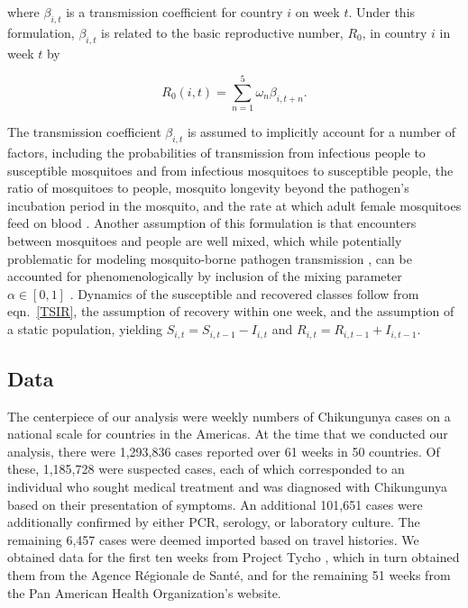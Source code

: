 \documentclass[11pt]{article}
\begin{document}
\noindent where $\beta_{i,t}$ is a transmission coefficient for country $i$ on week $t$. Under this formulation, $\beta_{i,t}$ is related to the basic reproductive number, $R_0$, in country $i$ in week $t$ by

\begin{equation}
R_0(i,t) = \sum_{n=1}^5 \omega_n \beta_{i,t+n} .
\end{equation}

\noindent The transmission coefficient $\beta_{i,t}$ is assumed to implicitly account for a number of factors, including the probabilities of transmission from infectious people to susceptible mosquitoes and from infectious mosquitoes to susceptible people, the ratio of mosquitoes to people, mosquito longevity beyond the pathogen's incubation period in the mosquito, and the rate at which adult female mosquitoes feed on blood \cite{Reich2013}. Another assumption of this formulation is that encounters between mosquitoes and people are well mixed, which while potentially problematic for modeling mosquito-borne pathogen transmission \cite{Perkins2013}, can be accounted for phenomenologically by inclusion of the mixing parameter $\alpha\in[0,1]$ \cite{Liu1987,Glass2003}. Dynamics of the susceptible and recovered classes follow from eqn.~\eqref{TSIR}, the assumption of recovery within one week, and the assumption of a static population, yielding $S_{i,t}=S_{i,t-1}-I_{i,t}$ and $R_{i,t}=R_{i,t-1}+I_{i,t-1}$.

\subsection*{Data}
The centerpiece of our analysis were weekly numbers of Chikungunya cases on a national scale for countries in the Americas. At the time that we conducted our analysis, there were 1,293,836 cases reported over 61 weeks in 50 countries. Of these, 1,185,728 were suspected cases, each of which corresponded to an individual who sought medical treatment and was diagnosed with Chikungunya based on their presentation of symptoms. An additional 101,651 cases were additionally confirmed by either PCR, serology, or laboratory culture. The remaining 6,457 cases were deemed imported based on travel histories. We obtained data for the first ten weeks from Project Tycho \cite{Panhuis2013}, which in turn obtained them from the Agence R\'{e}gionale de Sant\'{e}, and for the remaining 51 weeks from the Pan American Health Organization's website.
\end{document}
